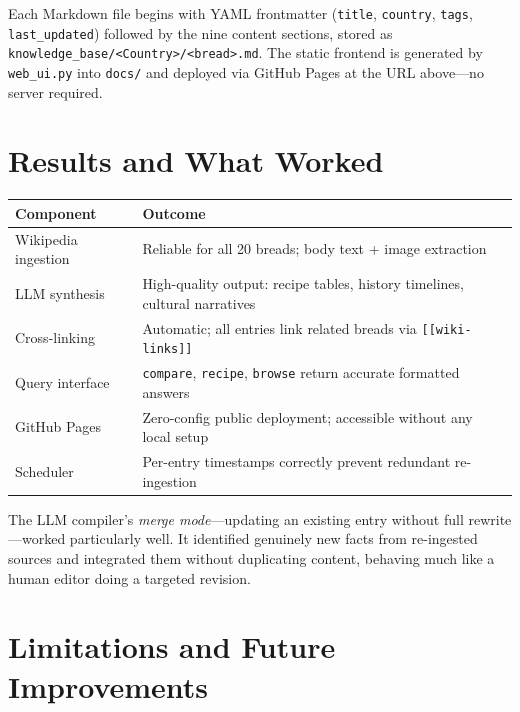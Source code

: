 \documentclass[10.5pt,a4paper]{article}
\begin{document}
Each Markdown file begins with YAML frontmatter (\texttt{title}, \texttt{country}, \texttt{tags}, \texttt{last\_updated}) followed by the nine content sections, stored as \texttt{knowledge\_base/<Country>/<bread>.md}. The static frontend is generated by \texttt{web\_ui.py} into \texttt{docs/} and deployed via GitHub Pages at the URL above---no server required.

\section{Results and What Worked}

\begin{tabularx}{\linewidth}{lX}
\toprule
\textbf{Component} & \textbf{Outcome} \\
\midrule
Wikipedia ingestion & Reliable for all 20 breads; body text + image extraction \\
LLM synthesis & High-quality output: recipe tables, history timelines, cultural narratives \\
Cross-linking & Automatic; all entries link related breads via \texttt{[[wiki-links]]} \\
Query interface & \texttt{compare}, \texttt{recipe}, \texttt{browse} return accurate formatted answers \\
GitHub Pages & Zero-config public deployment; accessible without any local setup \\
Scheduler & Per-entry timestamps correctly prevent redundant re-ingestion \\
\bottomrule
\end{tabularx}

\vspace{3pt}

The LLM compiler's \textit{merge mode}---updating an existing entry without full rewrite---worked particularly well. It identified genuinely new facts from re-ingested sources and integrated them without duplicating content, behaving much like a human editor doing a targeted revision.

\section{Limitations and Future Improvements}
\end{document}
